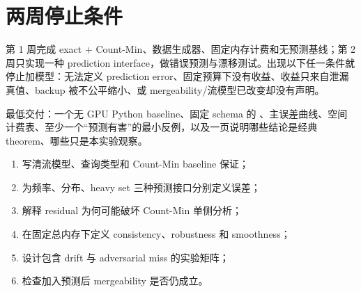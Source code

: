 \section{两周停止条件}

第 1 周完成 exact + Count-Min、数据生成器、固定内存计费和无预测基线；第 2 周只实现一种 prediction interface，做错误预测与漂移测试。出现以下任一条件就停止加模型：无法定义 prediction error、固定预算下没有收益、收益只来自泄漏真值、backup 被不公平缩小、或 mergeability/流模型已改变却没有声明。

\begin{protocolbox}
最低交付：一个无 GPU Python baseline、固定 schema 的 、主误差曲线、空间计费表、至少一个“预测有害”的最小反例，以及一页说明哪些结论是经典 theorem、哪些只是本实验观察。
\end{protocolbox}

\begin{checkpointbox}
\begin{enumerate}
  \item 写清流模型、查询类型和 Count-Min baseline 保证；
  \item 为频率、分布、heavy set 三种预测接口分别定义误差；
  \item 解释 residual 为何可能破坏 Count-Min 单侧分析；
  \item 在固定总内存下定义 consistency、robustness 和 smoothness；
  \item 设计包含 drift 与 adversarial miss 的实验矩阵；
  \item 检查加入预测后 mergeability 是否仍成立。
\end{enumerate}
\end{checkpointbox}
